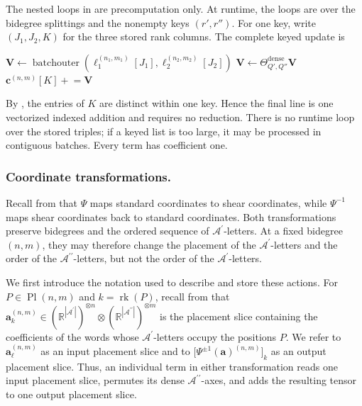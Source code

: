\documentclass{amsart}
\theoremstyle{definition}
\theoremstyle{remark}
\begin{document}
\begin{implrmk}
The nested loops in
 are precomputation only. At
runtime, the loops are over the bidegree splittings and the nonempty keys
$(r',r'')$. For one key, write $(J_1,J_2,K)$ for the three stored rank
columns. The complete keyed update is
\begin{algorithmic}[1]
\State $\mathbf{V}\gets
    \operatorname{batchouter}
    \left(
        \ell_1^{(n_1,m_1)}[J_1],
        \ell_2^{(n_2,m_2)}[J_2]
    \right)$
\State $\mathbf{V}\gets
    \Theta^{\mathrm{dense}}_{Q',Q''}\mathbf{V}$
\State $\mathbf{c}^{(n,m)}[K]\mathrel{+}=\mathbf{V}$
\end{algorithmic}
By , the entries of $K$ are distinct
within one key. Hence the final line is one vectorized indexed addition and
requires no reduction. There is no runtime loop over the stored triples;
if a keyed list is too large, it may be processed in contiguous batches.
Every term has coefficient one.
\end{implrmk}

\subsubsection{Coordinate transformations.}
\label{sec:transformations}

Recall from  that $\Psi$ maps
standard coordinates to shear coordinates, while $\Psi^{-1}$ maps shear
coordinates back to standard coordinates. Both transformations preserve
bidegrees and the ordered sequence of
$\mathcal{A}^{\prime}$-letters. At a fixed bidegree $(n,m)$, they may
therefore change the placement of the
$\mathcal{A}^{\prime}$-letters and the order of the
$\mathcal{A}^{\prime\prime}$-letters, but not the order of the
$\mathcal{A}^{\prime}$-letters.

We first introduce the notation used to describe and store these actions.
For
$P\in\operatorname{Pl}(n,m)$ and
$k=\operatorname{rk}(P)$, recall from
 that
\(
    \mathbf{a}^{(n,m)}_k
    \in
    (
        \mathbb{R}^{|\mathcal{A}^{\prime}|}
    )^{\otimes n}
    \otimes
    (
        \mathbb{R}^{|\mathcal{A}^{\prime\prime}|}
    )^{\otimes m}
\)
is the placement slice containing the coefficients of the words whose
$\mathcal{A}^{\prime}$-letters occupy the positions $P$. We refer to
$\mathbf{a}^{(n,m)}_\ell$ as an input placement slice and to
$\bigl[\Psi^{\pm1}(\mathbf{a})^{(n,m)}\bigr]_k$ as an output placement
slice. Thus, an individual term in either transformation reads one input
placement slice, permutes its dense
$\mathcal{A}^{\prime\prime}$-axes, and adds the resulting tensor to one
output placement slice.
\end{document}
